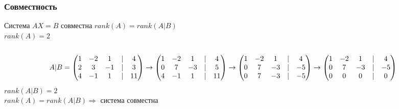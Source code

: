 \documentclass{article}
\begin{document}
    \subsubsection{Совместность}
    Система $AX = B$ совместна \iff $rank(A) = rank(A|B)$ \\
    $rank(A) = 2$ \\ \\
    \[A|B = 
    \begin{pmatrix}  
        1 &	-2 & 1 & | & 4 \\ 
        2 &	3 &	-1 & | & 3 \\
        4 &	-1 & 1 & | & 11 \\
    \end{pmatrix}
    \to
    \begin{pmatrix}  
        1 &	-2 & 1 & | & 4 \\ 
        0 &	7 &	-3 & | & 5 \\
        4 &	-1 & 1 & | & 11 \\
    \end{pmatrix}
    \to
    \begin{pmatrix}  
        1 &	-2 & 1 & | & 4 \\ 
        0 &	7 &	-3 & | & -5 \\
        0 &	7 & -3 & | & -5 \\
    \end{pmatrix}
    \to
    \begin{pmatrix}  
        1 &	-2 & 1 & | & 4 \\ 
        0 &	7 &	-3 & | & -5 \\
        0 &	0 & 0 & | & 0 \\
    \end{pmatrix} \\ \\ \\
    \] 
    $rank(A|B) = 2$ \\
    $rank(A) = rank(A|B) \Rightarrow$ система совместна
\end{document}
